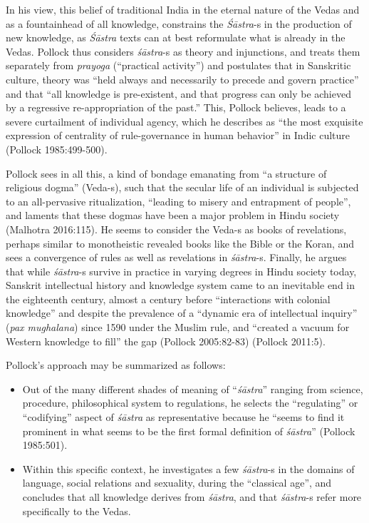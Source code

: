 In his view, this belief of traditional India in the eternal nature of the Vedas and as a fountainhead of all knowledge, constrains the {\sl Śāstra}-s in the production of new knowledge, as {\sl Śāstra} texts can at best reformulate what is already in the Vedas. Pollock thus considers {\sl śāstra}-s as theory and injunctions, and treats them separately from {\sl prayoga} (``practical activity'') and postulates that in Sanskritic culture, theory was ``held always and necessarily to precede and govern practice'' and that ``all knowledge is pre-existent, and that progress can only be achieved by a regressive re-appropriation of the past.'' This, Pollock believes, leads to a severe curtailment of individual agency, which he describes as ``the most exquisite expression of centrality of rule-governance in human behavior'' in Indic culture (Pollock 1985:499-500). 

Pollock sees in all this, a kind of bondage emanating from ``a structure of religious dogma'' (Veda-s), such that the secular life of an individual is subjected to an all-pervasive ritualization, ``leading to misery and entrapment of people'', and laments that these dogmas have been a major problem in Hindu society (Malhotra 2016:115). He seems to consider the Veda-s as books of revelations, perhaps similar to monotheistic revealed books like the Bible or the Koran, and sees a convergence of rules as well as revelations in {\sl śāstra}-s. Finally, he argues that while {\sl śāstra}-s survive in practice in varying degrees in Hindu society today, Sanskrit intellectual history and knowledge system came to an inevitable end in the eighteenth century, almost a century before ``interactions with colonial knowledge'' and despite the prevalence of a ``dynamic era of intellectual inquiry'' ({\sl pax mughalana}) since 1590 under the Muslim rule, and ``created a vacuum for Western knowledge to fill'' the gap (Pollock 2005:82-83) (Pollock 2011:5).

Pollock's approach may be summarized as follows:
\begin{itemize}
\item Out of the many different shades of meaning of ``{\sl śāstra}'' ranging from science, procedure, philosophical system to regulations, he selects the ``regulating'' or ``codifying'' aspect of {\sl śāstra} as representative because he ``seems to find it prominent in what seems to be the first formal definition of {\sl śāstra}'' (Pollock 1985:501).

\item Within this specific context, he investigates a few {\sl śāstra}-s in the domains of language, social relations and sexuality, during the ``classical age'', and concludes that all knowledge derives from {\sl śāstra}, and that {\sl śāstra}-s refer more specifically to the Vedas. 
\end{itemize}


